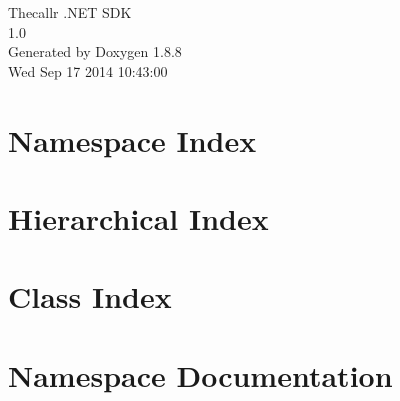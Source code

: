 \documentclass[twoside]{book}
\newcommand{\+}{\discretionary{\mbox{\scriptsize$\hookleftarrow$}}{}{}}
\newcommand{\clearemptydoublepage}{%
  \newpage{\pagestyle{empty}\cleardoublepage}%
}
\begin{document}
\hypersetup{pageanchor=false,
             bookmarks=true,
             bookmarksnumbered=true,
             pdfencoding=unicode
            }
\begin{titlepage}
\vspace*{7cm}
\begin{center}%
{\Large Thecallr .N\+E\+T S\+D\+K \\[1ex]\large 1.\+0 }\\
\vspace*{1cm}
{\large Generated by Doxygen 1.8.8}\\
\vspace*{0.5cm}
{\small Wed Sep 17 2014 10:43:00}\\
\end{center}
\end{titlepage}
\clearemptydoublepage
\tableofcontents
\clearemptydoublepage
{}
\hypersetup{pageanchor=true}

\chapter{Namespace Index}

\chapter{Hierarchical Index}

\chapter{Class Index}

\chapter{Namespace Documentation}



















\end{document}
